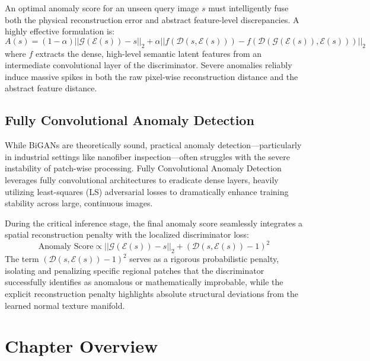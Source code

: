\begin{insightbox}
An optimal anomaly score for an unseen query image $s$ must intelligently fuse both the physical reconstruction error and abstract feature-level discrepancies. A highly effective formulation is:
\begin{equation}
A(s) = (1 - \alpha) ||\mathcal{G}(\mathcal{E}(s)) - s||_2 + \alpha ||f(\mathcal{D}(s, \mathcal{E}(s))) - f(\mathcal{D}(\mathcal{G}(\mathcal{E}(s)), \mathcal{E}(s)))||_2
\end{equation}
where $f$ extracts the dense, high-level semantic latent features from an intermediate convolutional layer of the discriminator. Severe anomalies reliably induce massive spikes in both the raw pixel-wise reconstruction distance and the abstract feature distance.
\end{insightbox}

\subsection{Fully Convolutional Anomaly Detection}
While BiGANs are theoretically sound, practical anomaly detection—particularly in industrial settings like nanofiber inspection—often struggles with the severe instability of patch-wise processing. Fully Convolutional Anomaly Detection leverages fully convolutional architectures to eradicate dense layers, heavily utilizing least-squares (LS) adversarial losses to dramatically enhance training stability across large, continuous images.

During the critical inference stage, the final anomaly score seamlessly integrates a spatial reconstruction penalty with the localized discriminator loss:
\begin{equation}
\text{Anomaly Score} \propto ||\mathcal{G}(\mathcal{E}(s)) - s||_2 + (\mathcal{D}(s, \mathcal{E}(s)) - 1)^2
\end{equation}
The term $(\mathcal{D}(s, \mathcal{E}(s)) - 1)^2$ serves as a rigorous probabilistic penalty, isolating and penalizing specific regional patches that the discriminator successfully identifies as anomalous or mathematically improbable, while the explicit reconstruction penalty highlights absolute structural deviations from the learned normal texture manifold.

\section{Chapter Overview}

